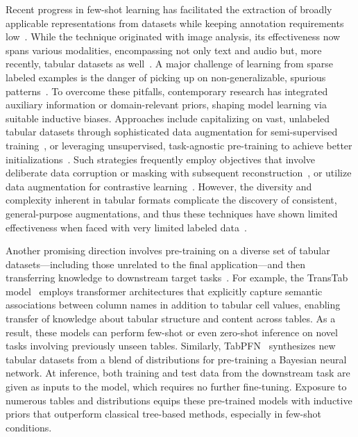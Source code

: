 Recent progress in few-shot learning has facilitated the extraction of broadly applicable representations from datasets while keeping annotation requirements low~\cite{chen2018closer}. While the technique originated with image analysis, its effectiveness now spans various modalities, encompassing not only text and audio but, more recently, tabular datasets as well~\cite{majumder2022few,nam2023stunt,schick2021exploiting}. A major challenge of learning from sparse labeled examples is the danger of picking up on non-generalizable, spurious patterns~\cite{bartlett2021deep}. To overcome these pitfalls, contemporary research has integrated auxiliary information or domain-relevant priors, shaping model learning via suitable inductive biases. Approaches include capitalizing on vast, unlabeled tabular datasets through sophisticated data augmentation for semi-supervised training~\cite{ucar2021subtab,yoon2020vime}, or leveraging unsupervised, task-agnostic pre-training to achieve better initializations~\cite{somepalli2021saint}. Such strategies frequently employ objectives that involve deliberate data corruption or masking with subsequent reconstruction~\cite{arik2021tabnet,majmundar2022met}, or utilize data augmentation for contrastive learning~\cite{bahri2022scarf,chen2020simple}. However, the diversity and complexity inherent in tabular formats complicate the discovery of consistent, general-purpose augmentations, and thus these techniques have shown limited effectiveness when faced with very limited labeled data~\cite{nam2023stunt}.

Another promising direction involves pre-training on a diverse set of tabular datasets—including those unrelated to the final application—and then transferring knowledge to downstream target tasks~\cite{zhang2023generative,levin2022transfer,zhu2023xtab}. For example, the TransTab model~\cite{wang2022transtab} employs transformer architectures that explicitly capture semantic associations between column names in addition to tabular cell values, enabling transfer of knowledge about tabular structure and content across tables. As a result, these models can perform few-shot or even zero-shot inference on novel tasks involving previously unseen tables. Similarly, TabPFN~\cite{hollmann2022tabpfn} synthesizes new tabular datasets from a blend of distributions for pre-training a Bayesian neural network. At inference, both training and test data from the downstream task are given as inputs to the model, which requires no further fine-tuning. Exposure to numerous tables and distributions equips these pre-trained models with inductive priors that outperform classical tree-based methods, especially in few-shot conditions.

